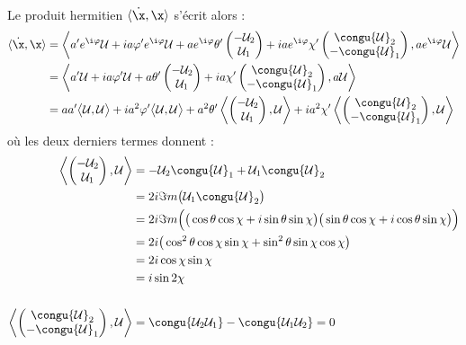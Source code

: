 \\
Le produit hermitien $\langle \dot{\x}, \x \rangle$ s'écrit alors :
\begin{align*}
	\langle \dot{\x}, \x \rangle 
	&= \left\langle a'e^{\i \varphi}\mathcal{U} + ia\varphi'e^{\i \varphi} \mathcal{U} + ae^{\i \varphi}\theta'\begin{pmatrix} -\mathcal{U}_2 \\ \mathcal{U}_1 \end{pmatrix} + iae^{\i \varphi}\chi'\begin{pmatrix} \congu{\mathcal{U}}_2 \\ -\congu{\mathcal{U}}_1 \end{pmatrix}, ae^{\i \varphi}\mathcal{U} \right\rangle \\
	&= \left\langle a'\mathcal{U} + ia\varphi' \mathcal{U} + a\theta'\begin{pmatrix} -\mathcal{U}_2 \\ \mathcal{U}_1 \end{pmatrix} + ia\chi'\begin{pmatrix} \congu{\mathcal{U}}_2 \\ -\congu{\mathcal{U}}_1 \end{pmatrix}, a\mathcal{U} \right\rangle \\
	&= aa' \big\langle \mathcal{U}, \mathcal{U}\big\rangle  + ia^2\varphi' \big\langle \mathcal{U}, \mathcal{U}\big\rangle  + a^2\theta'\left\langle \begin{pmatrix} -\mathcal{U}_2 \\ \mathcal{U}_1 \end{pmatrix}, \mathcal{U} \right\rangle + ia^2\chi'\left\langle \begin{pmatrix} \congu{\mathcal{U}}_2 \\ -\congu{\mathcal{U}}_1 \end{pmatrix}, \mathcal{U} \right\rangle
\end{align*}
où les deux derniers termes donnent :
\begin{align*}
	\left\langle \begin{pmatrix} -\mathcal{U}_2 \\ \mathcal{U}_1 \end{pmatrix}, \mathcal{U} \right\rangle &= -\mathcal{U}_2\congu{\mathcal{U}}_1 + \mathcal{U}_1\congu{\mathcal{U}}_2 \\
	&= 2i\Im m\big(\mathcal{U}_1 \congu{\mathcal{U}}_2\big) \\
	&= 2i\Im m\Big(\big( \cos\theta \cos\chi + i \sin\theta \sin\chi \big) \big( \sin\theta \cos\chi + i \cos\theta \sin\chi \big)\Big) \\
	&= 2i\big(\cos^2\theta \cos\chi \sin\chi + \sin^2\theta \sin\chi \cos\chi \big) \\
	&= 2i \cos\chi \sin\chi \\
	&= i\sin2\chi 
	\\ \\
	\left\langle \begin{pmatrix} \congu{\mathcal{U}}_2 \\ -\congu{\mathcal{U}}_1 \end{pmatrix}, \mathcal{U} \right\rangle &= \congu{\mathcal{U}_2\mathcal{U}_1} - \congu{\mathcal{U}_1\mathcal{U}_2} = 0
\end{align*}

